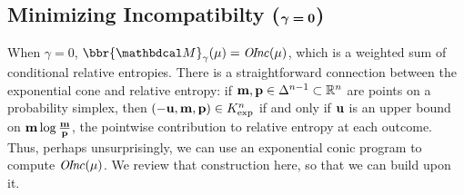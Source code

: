 \documentclass{article}
\newcommand\discard[1]{}
\newcommand\voli[1]{{\color{olicolor}\textbf{$\boldsymbol\{$Oli: }#1 \textbf{$\boldsymbol\}$}}}
\begin{document}

\subsection{%
    Minimizing Incompatibilty
    (\texorpdfstring{$\boldsymbol\gamma\boldsymbol=\mathbf{0}$}{gamma=0})%
} \label{sec:minimize-inc}

When $\gamma = 0$, $\bbr{\dg M}_\gamma(\mu)= \OInc(\mu)$, which is a
weighted sum of conditional relative entropies.
There is a straightforward connection between the exponential cone and
relative entropy:
if $\mathbf{m}, \mathbf{p} \in \Delta^{n-1} \subset \mathbb R^n$ are points on
a probability simplex,
then $(-\mathbf{u}, \mathbf{m}, \mathbf{p}) \in K_{\exp}^n$ if and only if
$\mathbf{u}$ is an upper bound on $\mathbf{m} \log \frac{\mathbf{m}}{\mathbf{p}}$,
the pointwise contribution to relative entropy at each outcome.
Thus, perhaps unsurprisingly, we can use an exponential conic program
to compute $\mathit{O\mskip-2.5muI\mskip-3.5mun\mskip-1.7muc}(\mu)$. 
We review that construction here,
so that we can build upon it.
\end{document}
